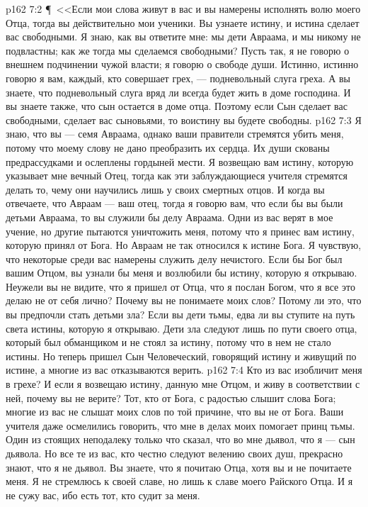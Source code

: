 \vs p162 7:2 \P\ <<Если мои слова живут в вас и вы намерены исполнять волю моего Отца, тогда вы действительно мои ученики. Вы узнаете истину, и истина сделает вас свободными. Я знаю, как вы ответите мне: мы дети Авраама, и мы никому не подвластны; как же тогда мы сделаемся свободными? Пусть так, я не говорю о внешнем подчинении чужой власти; я говорю о свободе души. Истинно, истинно говорю я вам, каждый, кто совершает грех, --- подневольный слуга греха. А вы знаете, что подневольный слуга вряд ли всегда будет жить в доме господина. И вы знаете также, что сын остается в доме отца. Поэтому если Сын сделает вас свободными, сделает вас сыновьями, то воистину вы будете свободны.
\vs p162 7:3 Я знаю, что вы --- семя Авраама, однако ваши правители стремятся убить меня, потому что моему слову не дано преобразить их сердца. Их души скованы предрассудками и ослеплены гордыней мести. Я возвещаю вам истину, которую указывает мне вечный Отец, тогда как эти заблуждающиеся учителя стремятся делать то, чему они научились лишь у своих смертных отцов. И когда вы отвечаете, что Авраам --- ваш отец, тогда я говорю вам, что если бы вы были детьми Авраама, то вы служили бы делу Авраама. Одни из вас верят в мое учение, но другие пытаются уничтожить меня, потому что я принес вам истину, которую принял от Бога. Но Авраам не так относился к истине Бога. Я чувствую, что некоторые среди вас намерены служить делу нечистого. Если бы Бог был вашим Отцом, вы узнали бы меня и возлюбили бы истину, которую я открываю. Неужели вы не видите, что я пришел от Отца, что я послан Богом, что я все это делаю не от себя лично? Почему вы не понимаете моих слов? Потому ли это, что вы предпочли стать детьми зла? Если вы дети тьмы, едва ли вы ступите на путь света истины, которую я открываю. Дети зла следуют лишь по пути своего отца, который был обманщиком и не стоял за истину, потому что в нем не стало истины. Но теперь пришел Сын Человеческий, говорящий истину и живущий по истине, а многие из вас отказываются верить.
\vs p162 7:4 Кто из вас изобличит меня в грехе? И если я возвещаю истину, данную мне Отцом, и живу в соответствии с ней, почему вы не верите? Тот, кто от Бога, с радостью слышит слова Бога; многие из вас не слышат моих слов по той причине, что вы не от Бога. Ваши учителя даже осмелились говорить, что мне в делах моих помогает принц тьмы. Один из стоящих неподалеку только что сказал, что во мне дьявол, что я --- сын дьявола. Но все те из вас, кто честно следуют велению своих душ, прекрасно знают, что я не дьявол. Вы знаете, что я почитаю Отца, хотя вы и не почитаете меня. Я не стремлюсь к своей славе, но лишь к славе моего Райского Отца. И я не сужу вас, ибо есть тот, кто судит за меня.
